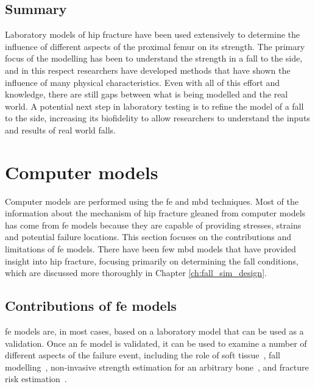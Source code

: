 \subsection{Summary}
\label{sec:intro_understanding_modelling_lab_summary}
Laboratory models of hip fracture have been used extensively to determine the influence of different aspects of the proximal femur on its strength.
The primary focus of the modelling has been to understand the strength in a fall to the side, and in this respect researchers have developed methods that have shown the influence of many physical characteristics.
Even with all of this effort and knowledge, there are still gaps between what is being modelled and the real world.
A potential next step in laboratory testing is to refine the model of a fall to the side, increasing its biofidelity to allow researchers to understand the inputs and results of real world falls.

\section{Computer models}
\label{sec:intro_understanding_modelling_comp}
Computer models are performed using the \acf{fe} and \acf{mbd} techniques.
Most of the information about the mechanism of hip fracture gleaned from computer models has come from \ac{fe} models because they are capable of providing stresses, strains and potential failure locations.
This section focuses on the contributions and limitations of \ac{fe} models.
There have been few \ac{mbd} models that have provided insight into hip fracture, focusing primarily on determining the fall conditions, which are discussed more thoroughly in Chapter \ref{ch:fall_sim_design}.

\subsection{Contributions of \acs*{fe} models}
\label{sec:intro_understanding_modelling_comp_use}
\ac{fe} models are, in most cases, based on a laboratory model that can be used as a validation.
Once an \ac{fe} model is validated, it can be used to examine a number of different aspects of the failure event, including the role of soft tissue~\citep{majumder_simulation_2007}, fall modelling~\citep{majumder_effects_2008}, non-invasive strength estimation for an arbitrary bone~\citep{keaveny_femoral_2008, srinivasan_relationship_2011, viceconti_automatic_2004}, and fracture risk estimation~\citep{orwoll_finite_2009, srinivasan_relationship_2011, tanck_predictive_2009}.

